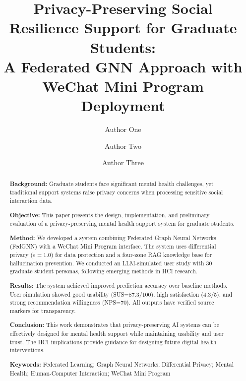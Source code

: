 \documentclass[preprint,12pt]{elsarticle}
\begin{document}
\begin{frontmatter}

\title{Privacy-Preserving Social Resilience Support for Graduate Students: \\
A Federated GNN Approach with WeChat Mini Program Deployment}

\author[inst1]{Author One}
\author[inst1]{Author Two}
\author[inst2]{Author Three}


\begin{abstract}
\textbf{Background:} Graduate students face significant mental health challenges,
yet traditional support systems raise privacy concerns when processing sensitive
social interaction data.

\textbf{Objective:} This paper presents the design, implementation, and preliminary
evaluation of a privacy-preserving mental health support system for graduate students.

\textbf{Method:} We developed a system combining Federated Graph Neural Networks
(FedGNN) with a WeChat Mini Program interface. The system uses differential privacy
($\varepsilon=1.0$) for data protection and a four-zone RAG knowledge base for
hallucination prevention. We conducted an LLM-simulated user study with 30 graduate
student personas, following emerging methods in HCI research.

\textbf{Results:} The system achieved improved prediction accuracy over baseline methods.
User simulation showed good usability (SUS=87.3/100), high satisfaction (4.3/5), and
strong recommendation willingness (NPS=70). All outputs have verified source markers
for transparency.

\textbf{Conclusion:} This work demonstrates that privacy-preserving AI systems
can be effectively designed for mental health support while maintaining usability
and user trust. The HCI implications provide guidance for designing future digital
health interventions.

\textbf{Keywords:} Federated Learning; Graph Neural Networks; Differential Privacy;
Mental Health; Human-Computer Interaction; WeChat Mini Program
\end{abstract}

\end{frontmatter}
\end{document}
